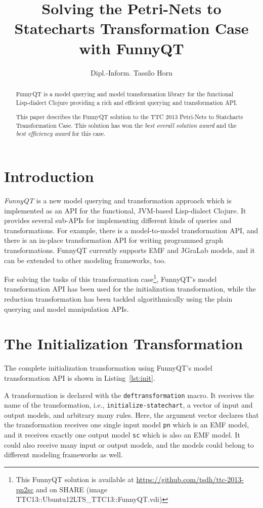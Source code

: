 \documentclass[submission]{eptcs}
\title{Solving the Petri-Nets to Statecharts Transformation Case with FunnyQT}
\author{Dipl.-Inform. Tassilo Horn
  \email{horn@uni-koblenz.de}
  \institute{Institute for Software Technology, University Koblenz-Landau, Germany}}
\begin{document}
\maketitle

\begin{abstract}
  FunnyQT is a model querying and model transformation library for the
  functional Lisp-dialect Clojure providing a rich and efficient querying and
  transformation API.

  This paper describes the FunnyQT solution to the TTC 2013 Petri-Nets to
  Statcharts Transformation Case.  This solution has won the \emph{best overall
    solution award} and the \emph{best efficiency award} for this case.
\end{abstract}

\section{Introduction}
\label{sec:introduction}

\emph{FunnyQT} is a new model querying and transformation approach which is
implemented as an API for the functional, JVM-based Lisp-dialect Clojure.  It
provides several sub-APIs for implementing different kinds of queries and
transformations.  For example, there is a model-to-model transformation API,
and there is an in-place transformation API for writing programmed graph
transformations.  FunnyQT currently supports EMF and JGraLab models, and it can
be extended to other modeling frameworks, too.

For solving the tasks of this transformation case\footnote{This FunnyQT
  solution is available at \url{https://github.com/tsdh/ttc-2013-pn2sc} and on
  SHARE (image
  \textsf{TTC13::Ubuntu12LTS\_TTC13::FunnyQT.vdi})\label{fn:github}}, FunnyQT's
model transformation API has been used for the initialization transformation,
while the reduction transformation has been tackled algorithmically using the
plain querying and model manipulation APIs.

\section{The Initialization Transformation}
\label{sec:init-transformation}

The complete initialization transformation using FunnyQT's model transformation
API is shown in Listing~\ref{lst:init}.

A transformation is declared with the \verb|deftransformation| macro.  It
receives the name of the transformation, i.e., \verb|initialize-statechart|, a
vector of input and output models, and arbitrary many rules.  Here, the
argument vector declares that the transformation receives one single input
model \verb|pn| which is an EMF model, and it receives exactly one output model
\verb|sc| which is also an EMF model.  It could also receive many input or
output models, and the models could belong to different modeling frameworks as
well.
\end{document}
